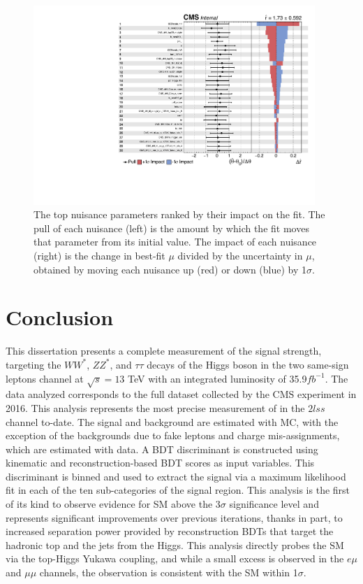 \begin{figure}[htb]
        \centering 
        \includegraphics[width=0.95\textwidth]{ch11_figs/impacts_ttH_13TeV_top30.pdf}
        \caption[Nuisance parameter impacts]{The top nuisance parameters ranked by their impact on the fit. The pull of each nuisance (left) is the amount by which the fit moves that parameter from its
        initial value. The impact of each nuisance (right) is the change in best-fit $\mu$ divided by the uncertainty in $\mu$, obtained by moving each nuisance up (red) or down (blue) by 1$\sigma$.}
        \label{fig:impacts}
\end{figure}



\section{Conclusion}
This dissertation presents a complete measurement of the \tth signal strength, targeting the $WW^{*}$, $ZZ^{*}$, and $\tau\tau$ decays of the Higgs boson
in the two same-sign leptons channel at $\sqrt{s} = 13$ TeV with an integrated luminosity of 35.9$fb^{-1}$.
The data analyzed corresponds to the full dataset collected by the CMS experiment in 2016.
This analysis represents the most precise measurement of \tth in the $2lss$ channel to-date.
The signal and background are estimated with MC, with the exception of the backgrounds due to fake leptons and charge mis-assignments,
which are estimated with data. A BDT discriminant is constructed using kinematic and reconstruction-based BDT scores as input variables.
This discriminant is binned and used to extract the signal via a maximum likelihood fit in each of the ten sub-categories of the signal region.
This analysis is the first of its kind to observe evidence for SM \tth above the 3$\sigma$ significance level and represents significant
improvements over previous iterations, thanks in part, to increased separation power provided by reconstruction BDTs that target the hadronic top
and the jets from the Higgs. This analysis directly probes the SM via the top-Higgs Yukawa coupling, and while a small excess is observed
in the $e\mu$ and $\mu\mu$ channels, the observation is consistent with the SM within 1$\sigma$. 

